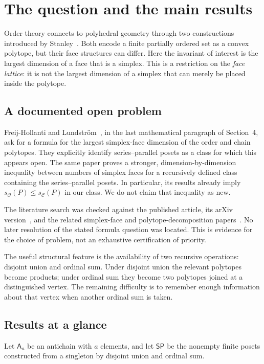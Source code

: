 \documentclass[11pt]{article}
\theoremstyle{definition}
\newcommand{\OO}{\mathcal O}
\newcommand{\CC}{\mathcal C}
\newcommand{\sO}{s_{\OO}}
\newcommand{\sC}{s_{\CC}}
\newcommand{\SP}{\mathsf{SP}}
\newcommand{\A}[1]{\mathsf A_{#1}}
\begin{document}
\clearpage
\tableofcontents
\clearpage

\section{The question and the main results}\label{sec:intro}

Order theory connects to polyhedral geometry through two constructions introduced by Stanley~\cite{Stanley1986}. Both encode a finite partially ordered set as a convex polytope, but their face structures can differ. Here the invariant of interest is the largest dimension of a face that is a simplex. This is a restriction on the \emph{face lattice}: it is not the largest dimension of a simplex that can merely be placed inside the polytope.

\subsection{A documented open problem}
Freij-Hollanti and Lundstr\"om~\cite{FHL2026}, in the last mathematical paragraph of Section~4, ask for a formula for the largest simplex-face dimension of the order and chain polytopes. They explicitly identify series--parallel posets as a class for which this appears open. The same paper proves a stronger, dimension-by-dimension inequality between numbers of simplex faces for a recursively defined class containing the series--parallel posets. In particular, its results already imply $\sO(P)\le\sC(P)$ in our class. We do not claim that inequality as new.

The literature search was checked against the published article, its arXiv version~\cite{FHLpreprint}, and the related simplex-face and polytope-decomposition papers~\cite{FHL2024,Mori2025,MoriOhsugi2026}. No later resolution of the stated formula question was located. This is evidence for the choice of problem, not an exhaustive certification of priority.

The useful structural feature is the availability of two recursive operations: disjoint union and ordinal sum. Under disjoint union the relevant polytopes become products; under ordinal sum they become two polytopes joined at a distinguished vertex. The remaining difficulty is to remember enough information about that vertex when another ordinal sum is taken.

\subsection{Results at a glance}
Let $\A a$ be an antichain with $a$ elements, and let $\SP$ be the nonempty finite posets constructed from a singleton by disjoint union and ordinal sum.
\end{document}
